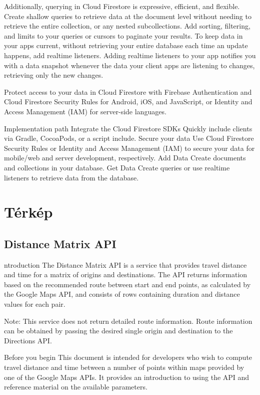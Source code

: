 Additionally, querying in Cloud Firestore is expressive, efficient, and flexible. Create shallow queries to retrieve data at the document level without needing to retrieve the entire collection, or any nested subcollections. Add sorting, filtering, and limits to your queries or cursors to paginate your results. To keep data in your apps current, without retrieving your entire database each time an update happens, add realtime listeners. Adding realtime listeners to your app notifies you with a data snapshot whenever the data your client apps are listening to changes, retrieving only the new changes.

Protect access to your data in Cloud Firestore with Firebase Authentication and Cloud Firestore Security Rules for Android, iOS, and JavaScript, or Identity and Access Management (IAM) for server-side languages.

Implementation path
Integrate the Cloud Firestore SDKs	Quickly include clients via Gradle, CocoaPods, or a script include.
Secure your data	Use Cloud Firestore Security Rules or Identity and Access Management (IAM) to secure your data for mobile/web and server development, respectively.
Add Data	Create documents and collections in your database.
Get Data	Create queries or use realtime listeners to retrieve data from the database.

\section{Térkép}\label{sec:ALAP:szerkeszt}

\subsection{Distance Matrix API}

ntroduction
The Distance Matrix API is a service that provides travel distance and time for a matrix of origins and destinations. The API returns information based on the recommended route between start and end points, as calculated by the Google Maps API, and consists of rows containing duration and distance values for each pair.

Note: This service does not return detailed route information. Route information can be obtained by passing the desired single origin and destination to the Directions API.

Before you begin
This document is intended for developers who wish to compute travel distance and time between a number of points within maps provided by one of the Google Maps APIs. It provides an introduction to using the API and reference material on the available parameters.

